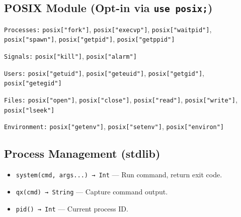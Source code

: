 \subsection{POSIX Module (Opt-in via \texttt{use posix;})}
\texttt{Processes:} \texttt{posix["fork"]}, \texttt{posix["execvp"]}, \texttt{posix["waitpid"]}, \texttt{posix["spawn"]}, \texttt{posix["getpid"]}, \texttt{posix["getppid"]}

\texttt{Signals:} \texttt{posix["kill"]}, \texttt{posix["alarm"]}

\texttt{Users:} \texttt{posix["getuid"]}, \texttt{posix["geteuid"]}, \texttt{posix["getgid"]}, \texttt{posix["getegid"]}

\texttt{Files:} \texttt{posix["open"]}, \texttt{posix["close"]}, \texttt{posix["read"]}, \texttt{posix["write"]}, \texttt{posix["lseek"]}

\texttt{Environment:} \texttt{posix["getenv"]}, \texttt{posix["setenv"]}, \texttt{posix["environ"]}

\subsection{Process Management (stdlib)}
\begin{itemize}
    \item \texttt{system(cmd, args...) → Int} — Run command, return exit code.
    \item \texttt{qx(cmd) → String} — Capture command output.
    \item \texttt{pid() → Int} — Current process ID.
\end{itemize}
